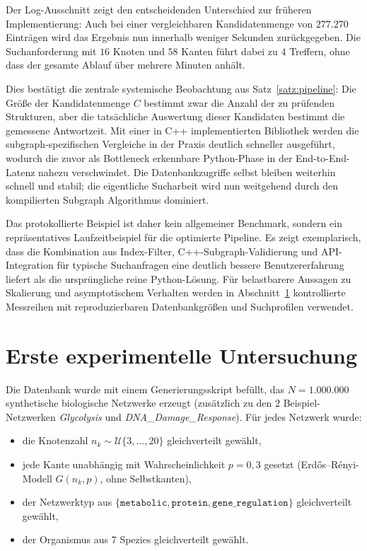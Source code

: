 \documentclass[a4paper,12pt, twoside]{report}
\theoremstyle{definition}
\begin{document}
Der Log-Ausschnitt zeigt den entscheidenden Unterschied zur früheren Implementierung: Auch bei einer vergleichbaren Kandidatenmenge von $277.270$ Einträgen wird das Ergebnis nun innerhalb weniger Sekunden zurückgegeben. Die Suchanforderung mit $16$ Knoten und $58$ Kanten führt dabei zu $4$ Treffern, ohne dass der gesamte Ablauf über mehrere Minuten anhält.

Dies bestätigt die zentrale systemische Beobachtung aus Satz~\ref{satz:pipeline}: Die Größe der Kandidatenmenge $C$ bestimmt zwar die Anzahl der zu prüfenden Strukturen, aber die tatsächliche Auswertung dieser Kandidaten bestimmt die gemessene Antwortzeit. Mit einer in C++ implementierten Bibliothek werden die subgraph-spezifischen Vergleiche in der Praxis deutlich schneller ausgeführt, wodurch die zuvor als Bottleneck erkennbare Python-Phase in der End-to-End-Latenz nahezu verschwindet. Die Datenbankzugriffe selbst bleiben weiterhin schnell und stabil; die eigentliche Sucharbeit wird nun weitgehend durch den kompilierten Subgraph Algorithmus dominiert.

Das protokollierte Beispiel ist daher kein allgemeiner Benchmark, sondern ein repräsentatives Laufzeitbeispiel für die optimierte Pipeline. Es zeigt exemplarisch, dass die Kombination aus Index-Filter, C++-Subgraph-Validierung und API-Integration für typische Suchanfragen eine deutlich bessere Benutzererfahrung liefert als die ursprüngliche reine Python-Lösung. Für belastbarere Aussagen zu Skalierung und asymptotischem Verhalten werden in Abschnitt~\ref{sec:evaluation} kontrollierte Messreihen mit reproduzierbaren Datenbankgrößen und Suchprofilen verwendet.

\chapter{Erste experimentelle Untersuchung}
\label{sec:evaluation}

Die Datenbank wurde mit einem Generierungsskript befüllt, das $N = 1.000.000$ synthetische biologische Netzwerke erzeugt (zusätzlich zu den $2$ Beispiel-Netzwerken \emph{Glycolysis} und \emph{DNA\_Damage\_Response}). Für jedes Netzwerk wurde:
\begin{itemize}
	\item die Knotenzahl $n_k \sim \mathcal{U}\{3,\ldots,20\}$ gleichverteilt gewählt,
	\item jede Kante unabhängig mit Wahrscheinlichkeit $p = 0{,}3$ gesetzt (Erdős–Rényi-Modell $G(n_k,p)$, ohne Selbstkanten),
	\item der Netzwerktyp aus $\{\texttt{metabolic}, \texttt{protein}, \texttt{gene\_regulation}\}$ gleichverteilt gewählt,
	\item der Organismus aus $7$ Spezies gleichverteilt gewählt.
\end{itemize}
\end{document}
